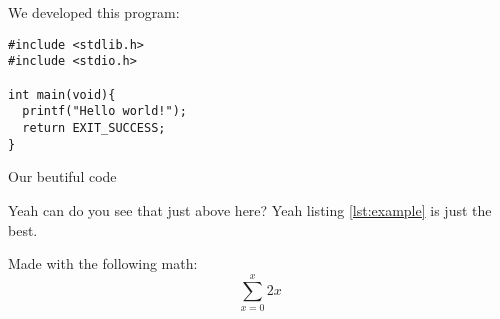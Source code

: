 \chapter{\solutionname}
We developed this program:

\begin{listing}[H]
\begin{verbatim}
#include <stdlib.h>
#include <stdio.h>

int main(void){
  printf("Hello world!");
  return EXIT_SUCCESS;
}
\end{verbatim}
\caption{Our beutiful code}
\label{lst:example}
\end{listing}

Yeah can do you see that just above here?
Yeah listing \ref{lst:example} is just the best.

Made with the following math:
\[\sum^x_{x=0} 2x\]
